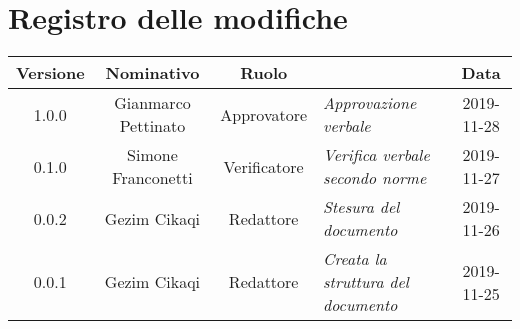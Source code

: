 \section*{Registro delle modifiche}
\renewcommand{\arraystretch}{1.8}
  
  \begin{longtable}{|c|c|c|p{3.8cm}|c|}
    \hline
    
    \rowcolor{header}
    \textbf{Versione} & \textbf{Nominativo} & \textbf{Ruolo} & \centering{\textbf{Descrizione}} & \textbf{Data}\\
    
    \hline
    
    1.0.0 & Gianmarco Pettinato & Approvatore & \small{\textit{Approvazione verbale}} & 2019-11-28\\
    0.1.0 & Simone Franconetti & Verificatore & \small{\textit{Verifica verbale secondo norme}} & 2019-11-27\\
    0.0.2 & Gezim Cikaqi & Redattore & \small{\textit{Stesura del documento}} & 2019-11-26\\
    0.0.1 & Gezim Cikaqi & Redattore & \small{\textit{Creata la struttura del documento}} & 2019-11-25\\
    
    \hline
  \end{longtable}